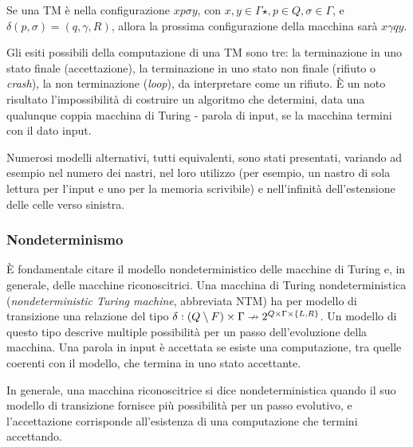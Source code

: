 \begin{examp}
	Se una TM è nella configurazione $xp\sigma y$, con $x,y\in\Gamma\star, p\in Q,\sigma\in\Gamma$, e $\delta(p,\sigma)=(q,\gamma,R)$, allora la prossima configurazione della macchina sarà $x\gamma qy$.
\end{examp}

Gli esiti possibili della computazione di una TM sono tre: la terminazione in uno stato finale (accettazione), la terminazione in uno stato non finale (rifiuto o \emph{crash}), la non terminazione (\emph{loop}), da interpretare come un rifiuto. È un noto risultato l'impossibilità di costruire un algoritmo che determini, data una qualunque coppia macchina di Turing - parola di input, se la macchina termini con il dato input.

Numerosi modelli alternativi, tutti equivalenti, sono stati presentati, variando ad esempio nel numero dei nastri, nel loro utilizzo (per esempio, un nastro di sola lettura per l'input e uno per la memoria scrivibile) e nell'infinità dell'estensione delle celle verso sinistra.

\subsubsection{Nondeterminismo}
È fondamentale citare il modello nondeterministico delle macchine di Turing e, in generale, delle macchine riconoscitrici. Una macchina di Turing nondeterministica (\emph{nondeterministic Turing machine}, abbreviata NTM) ha per modello di transizione una relazione del tipo $\delta:(Q\setminus F)\times\Gamma\nrightarrow 2^{Q\times\Gamma\times\left\{ L,R \right\}}$. Un modello di questo tipo descrive multiple possibilità per un passo dell'evoluzione della macchina. Una parola in input è accettata se esiste una computazione, tra quelle coerenti con il modello, che termina in uno stato accettante.

In generale, una macchina riconoscitrice si dice nondeterministica quando il suo modello di transizione fornisce più possibilità per un passo evolutivo, e l'accettazione corrisponde all'esistenza di una computazione che termini accettando.

